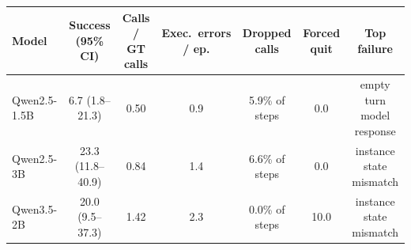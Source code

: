 \begin{tabular}{lcccccc}
\toprule
Model & Success (95\% CI) & Calls / GT calls & Exec.\ errors / ep. & Dropped calls & Forced quit & Top failure \\
\midrule
Qwen2.5-1.5B & 6.7 (1.8--21.3) & 0.50 & 0.9 & 5.9\% of steps & 0.0 & \small{empty turn model response} \\
Qwen2.5-3B & 23.3 (11.8--40.9) & 0.84 & 1.4 & 6.6\% of steps & 0.0 & \small{instance state mismatch} \\
Qwen3.5-2B & 20.0 (9.5--37.3) & 1.42 & 2.3 & 0.0\% of steps & 10.0 & \small{instance state mismatch} \\
\bottomrule
\end{tabular}
